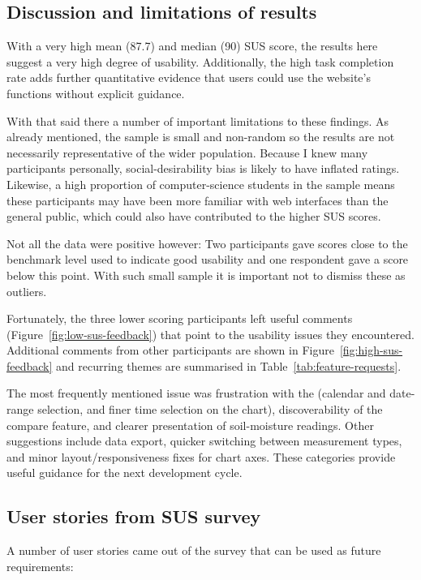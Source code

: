 \subsection{Discussion and limitations of results}

With a very high mean (87.7) and median (90) SUS score, the results here suggest
a very high degree of usability. Additionally, the high task completion rate
adds further quantitative evidence that users could use the website's functions
without explicit guidance.

With that said there a number of important limitations to these findings. As
already mentioned, the sample is small and non-random so the results are not
necessarily representative of the wider population. Because I knew many
participants personally, social-desirability bias is likely to have inflated
ratings. Likewise, a high proportion of computer-science students in the sample
means these participants may have been more familiar with web interfaces than
the general public, which could also have contributed to the higher SUS scores.

Not all the data were positive however: Two participants gave scores close to
the benchmark level used to indicate good usability and one respondent gave a
score below this point. With such small sample it is important not to dismiss
these as outliers. 

Fortunately, the three lower scoring participants left useful comments
(Figure~\ref{fig:low-sus-feedback}) that point to the usability issues they
encountered. Additional comments from other participants are shown in
Figure~\ref{fig:high-sus-feedback} and recurring themes are summarised in
Table~\ref{tab:feature-requests}.

The most frequently mentioned issue was frustration with the (calendar and
date-range selection, and finer time selection on the chart), discoverability of
the compare feature, and clearer presentation of soil-moisture readings. Other
suggestions include data export, quicker switching between measurement types,
and minor layout/responsiveness fixes for chart axes. These categories provide
useful guidance for the next development cycle.

\subsection{User stories from SUS survey} \label{sec:user-story}

A number of user stories came out of the survey that can be used as future
requirements:

